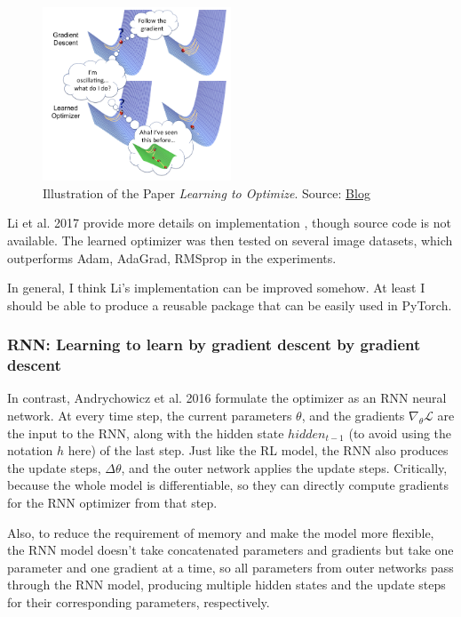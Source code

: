 \begin{figure}[h]
    \centering
    \includegraphics[width=0.5\textwidth]{images/learn-to-optimize.png}
    \caption{Illustration of the Paper \emph{Learning to Optimize}. Source: \href{https://bair.berkeley.edu/blog/2017/09/12/learning-to-optimize-with-rl/}{Blog}}
    \label{fig:world_model}
\end{figure}

Li et al. 2017 provide more details on implementation \cite{li2017learning}, though source code is not available.
The learned optimizer was then tested on several image datasets, which outperforms Adam, AdaGrad, RMSprop in the experiments.

In general, I think Li's implementation can be improved somehow. 
At least I should be able to produce a reusable package that can be easily used in PyTorch.

\subsubsection{RNN: Learning to learn by gradient descent by gradient descent}
In contrast, Andrychowicz et al. 2016\cite{andrychowicz2016learning} formulate the optimizer as an RNN neural network.
At every time step, the current parameters $\theta$, and the gradients $\nabla_\theta \mathcal{L}$ are the input to the RNN, along with the hidden state $hidden_{t-1}$ (to avoid using the notation $h$ here) of the last step.
Just like the RL model, the RNN also produces the update steps, $\Delta \theta$, and the outer network applies the update steps.
Critically, because the whole model is differentiable, so they can directly compute gradients for the RNN optimizer from that step.

Also, to reduce the requirement of memory and make the model more flexible, the RNN model doesn't take concatenated parameters and gradients but take one parameter and one gradient at a time, so all parameters from outer networks pass through the RNN model, producing multiple hidden states and the update steps for their corresponding parameters, respectively.

